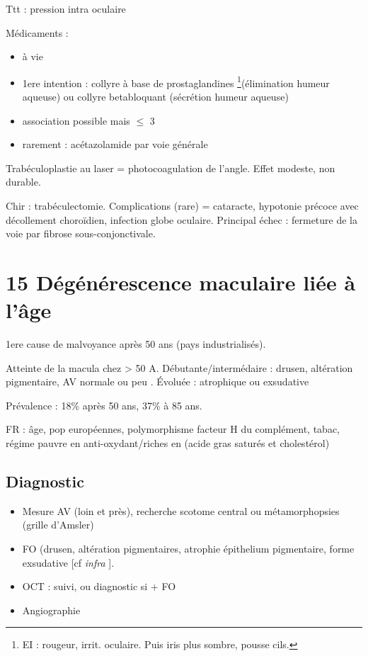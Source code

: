 \documentclass[11pt]{article}
\begin{document}
Ttt : \dec pression intra oculaire

Médicaments :
\begin{itemize}
\item à vie
\item 1ere intention : collyre à base de prostaglandines \footnote{EI : rougeur, irrit. oculaire. Puis iris plus sombre, \inc pousse cils.}(\inc élimination humeur
aqueuse) ou collyre betabloquant
(\dec sécrétion humeur aqueuse)
\item association possible mais \(\le\) 3
\item rarement : acétazolamide par voie générale
\end{itemize}

Trabéculoplastie au laser = photocoagulation de l'angle. Effet modeste, non durable.

Chir : trabéculectomie. Complications (rare) = cataracte, hypotonie précoce
avec décollement choroïdien, infection globe oculaire. Principal échec :
fermeture de la voie par fibrose sous-conjonctivale.

\section{15 Dégénérescence maculaire liée à l'âge}
\label{sec:org8e69b43}
1ere cause de malvoyance après 50 ans (pays industrialisés).

Atteinte de la macula chez > 50 A. Débutante/intermédaire : drusen, altération
pigmentaire, AV normale ou peu \dec. Évoluée : atrophique ou exsudative

Prévalence : 18\% après 50 ans, 37\% à 85 ans.

FR : âge, pop européennes, polymorphisme facteur H du complément, tabac, régime
pauvre en anti-oxydant/riches en (acide gras saturés et cholestérol)

\subsection{Diagnostic}
\label{sec:org55a703b}
\begin{itemize}
\item Mesure AV (loin et près), recherche scotome central ou métamorphopsies (grille d'Amsler)
\item FO (drusen, altération pigmentaires, atrophie épithelium pigmentaire, forme
exsudative [cf \emph{infra} ].
\item OCT : suivi, ou diagnostic si + FO
\item Angiographie
\end{itemize}
\end{document}

